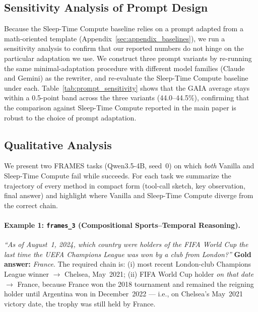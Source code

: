 \subsection{Sensitivity Analysis of Prompt Design}
\label{sec:appendix_prompt_sensitivity}
Because the Sleep-Time Compute baseline relies on a prompt adapted from a math-oriented template (Appendix~\ref{sec:appendix_baselines}), we run a sensitivity analysis to confirm that our reported numbers do not hinge on the particular adaptation we use. We construct three prompt variants by re-running the same minimal-adaptation procedure with different model families (Claude and Gemini) as the rewriter, and re-evaluate the Sleep-Time Compute baseline under each. Table~\ref{tab:prompt_sensitivity} shows that the GAIA average stays within a 0.5-point band across the three variants (44.0--44.5\%), confirming that the comparison against Sleep-Time Compute reported in the main paper is robust to the choice of prompt adaptation.

\subsection{Qualitative Analysis}
\label{sec:appendix_qualitative}

We present two FRAMES tasks (Qwen3.5-4B, seed~0) on which \emph{both} Vanilla and Sleep-Time Compute fail while \methodname{} succeeds. For each task we summarize the trajectory of every method in compact form (tool-call sketch, key observation, final answer) and highlight where Vanilla and Sleep-Time Compute diverge from the correct chain.

\paragraph{Example 1: \texttt{frames\_3} (Compositional Sports--Temporal Reasoning).}
\textit{``As of August~1, 2024, which country were holders of the FIFA World Cup the last time the UEFA Champions League was won by a club from London?''} \textbf{Gold answer:} \emph{France}. The required chain is: (i) most recent London-club Champions League winner $\rightarrow$ Chelsea, May~2021; (ii) FIFA World Cup holder \emph{on that date} $\rightarrow$ France, because France won the 2018 tournament and remained the reigning holder until Argentina won in December~2022 --- i.e., on Chelsea's May~2021 victory date, the trophy was still held by France.

